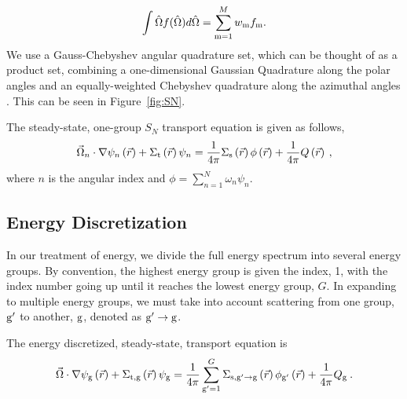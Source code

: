 %
\begin{equation}

\int \hat{\Omega} f(\hat{\Omega}) d \hat{\Omega} = \sum\limits_{\mrm=1}^{M} w_\mrm f_\mrm.    

\end{equation}
We use a Gauss-Chebyshev angular quadrature set, which can be thought of as a product set, combining a one-dimensional Gaussian Quadrature along the polar angles and an equally-weighted Chebyshev quadrature along the azimuthal angles \cite{jarrel-thesis}. This can be seen in Figure~\ref{fig:SN}. 

The steady-state, one-group $S_N$ transport equation is given as follows,
%
 \begin{equation}
  \vec{\Omega}_n \cdot \nabla \psi_n \left(\vec{r}\right)+ \Sigma_{\mathrm{t}}\left(\vec{r}\right)\psi_n = \frac{1}{4 \pi} \Sigma_{\mathrm{s}}\left(\vec{r}\right) \phi\left(\vec{r}\right) + \frac{1}{4 \pi} Q\left(\vec{r}\right)\:,
  \label{eq:transport-angular}
 \end{equation}
where $n$ is the angular index and $\phi = \sum\limits_{n=1}^N \omega_n \psi_n$.

\subsection{Energy Discretization}
In our treatment of energy, we divide the full energy spectrum into several energy groups. By convention, the highest energy group is given the index, 1, with the index number going up until it reaches the lowest energy group, $G$. In expanding to multiple energy groups, we must take into account scattering from one group, $\mathrm{g}'$ to another, $\mathrm{g}$, denoted as $\mathrm{g}' \rightarrow \mathrm{g} $. 

The energy discretized, steady-state, transport equation is
%
 \begin{equation}
  \vec{\Omega} \cdot \nabla \psi_{\mathrm{g}} \left(\vec{r}\right)+ \Sigma_{\mathrm{t}, \mathrm{g}}\left(\vec{r}\right)\psi_{\mathrm{g}} = \frac{1}{4 \pi} \sum\limits_{\mathrm{g}'=1}^{G}\Sigma_{\mathrm{s}, \mathrm{g}' \rightarrow \mathrm{g}}\left(\vec{r}\right) \phi_{\mathrm{g}'}\left(\vec{r}\right) + \frac{1}{4 \pi} Q_{\mathrm{g}}\:.
  \label{eq:transport-energy}
 \end{equation}


